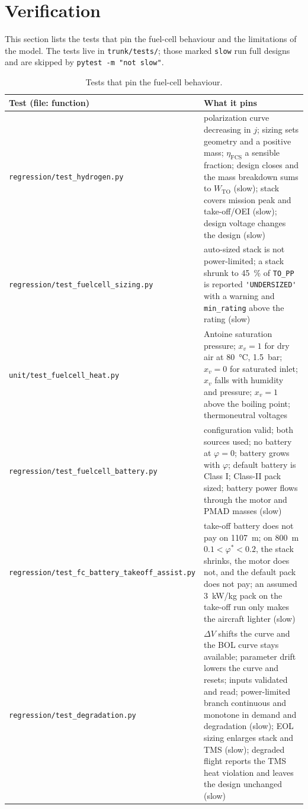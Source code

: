 \documentclass[a4paper,11pt]{article}
\newcommand{\code}[1]{\nolinkurl{#1}}
\newcommand{\fn}[1]{\nolinkurl{#1}}
\begin{document}
\section{Verification}
\label{sec:verification}

This section lists the tests that pin the fuel-cell behaviour and the limitations of the model.
The tests live in \fn{trunk/tests/}; those marked \code{slow} run full designs and are skipped
by \code{pytest -m "not slow"}.

\begin{table}[ht]
\centering\small
\caption{Tests that pin the fuel-cell behaviour.}
\label{tab:tests}
\begin{tabularx}{\textwidth}{@{}p{5.4cm}X@{}}
\toprule
Test (file: function) & What it pins \\
\midrule
\fn{regression/test_hydrogen.py} & polarization curve decreasing in $j$; sizing sets geometry and a positive mass; $\eta_\mathrm{FCS}$ a sensible fraction; design closes and the mass breakdown sums to $W_\mathrm{TO}$ (slow); stack covers mission peak and take-off/OEI (slow); design voltage changes the design (slow) \\
\fn{regression/test_fuelcell_sizing.py} & auto-sized stack is not power-limited; a stack shrunk to \SI{45}{\percent} of \code{TO_PP} is reported \code{'UNDERSIZED'} with a warning and \code{min_rating} above the rating (slow) \\
\fn{unit/test_fuelcell_heat.py} & Antoine saturation pressure; $x_v=1$ for dry air at \SI{80}{\celsius}, \SI{1.5}{bar}; $x_v=0$ for saturated inlet; $x_v$ falls with humidity and pressure; $x_v=1$ above the boiling point; thermoneutral voltages \\
\fn{regression/test_fuelcell_battery.py} & configuration valid; both sources used; no battery at $\varphi=0$; battery grows with $\varphi$; default battery is Class I; Class-II pack sized; battery power flows through the motor and PMAD masses (slow) \\
\fn{regression/test_fc_battery_takeoff_assist.py} & take-off battery does not pay on \SI{1107}{m}; on \SI{800}{m} $0.1<\varphi^*<0.2$, the stack shrinks, the motor does not, and the default pack does not pay; an assumed \SI{3}{kW/kg} pack on the take-off run only makes the aircraft lighter (slow) \\
\fn{regression/test_degradation.py} & $\Delta V$ shifts the curve and the BOL curve stays available; parameter drift lowers the curve and resets; inputs validated and read; power-limited branch continuous and monotone in demand and degradation (slow); EOL sizing enlarges stack and TMS (slow); degraded flight reports the TMS heat violation and leaves the design unchanged (slow) \\

\end{tabularx}
\end{table}
\end{document}

